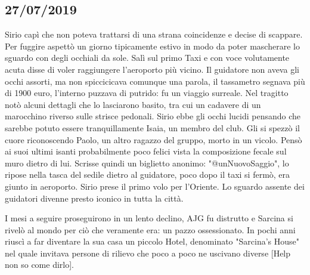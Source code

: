 \subsection*{27/07/2019}
Sirio capì che non poteva trattarsi di una strana coincidenze e decise di scappare. Per fuggire aspettò un giorno tipicamente estivo in modo da poter mascherare lo sguardo con degli occhiali da sole. Salì sul primo Taxi e con voce volutamente acuta disse di voler raggiungere l'aeroporto più vicino. Il guidatore non aveva gli occhi assorti, ma non spiccicicava comunque una parola, il tassametro segnava più di 1900 euro, l'interno puzzava di putrido: fu un viaggio surreale. 
Nel tragitto notò alcuni dettagli che lo lasciarono basito, tra cui un cadavere di un marocchino riverso sulle strisce pedonali. Sirio ebbe gli occhi lucidi pensando che sarebbe potuto essere tranquillamente Isaia, un membro del club. Gli si spezzò il cuore riconoscendo Paolo, un altro ragazzo del gruppo, morto in un vicolo. Pensò ai suoi ultimi isanti probabilmente poco felici vista la composizione fecale sul muro dietro di lui. Scrisse quindi un biglietto anonimo: "@unNuovoSaggio", lo ripose nella tasca del sedile dietro al guidatore, poco dopo il taxi si fermò, era giunto in aeroporto. Sirio prese il primo volo per l'Oriente. Lo sguardo assente dei guidatori divenne presto iconico in tutta la città.


I mesi a seguire proseguirono in un lento declino, AJG fu distrutto e Sarcina si rivelò al mondo per ciò che veramente era: un pazzo ossessionato. In pochi anni riuscì a far diventare la sua casa un piccolo Hotel, denominato "Sarcina's House" nel quale invitava persone di rilievo che poco a poco ne uscivano diverse [Help non so come dirlo]. 
